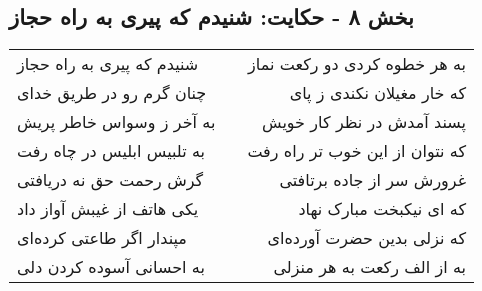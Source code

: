 \begin{center}
\section*{بخش ۸ - حکایت: شنیدم که پیری به راه حجاز}
\label{sec:008}
\begin{longtable}{l p{0.5cm} r}
شنیدم که پیری به راه حجاز
&&
به هر خطوه کردی دو رکعت نماز
\\
چنان گرم رو در طریق خدای
&&
که خار مغیلان نکندی ز پای
\\
به آخر ز وسواس خاطر پریش
&&
پسند آمدش در نظر کار خویش
\\
به تلبیس ابلیس در چاه رفت
&&
که نتوان از این خوب تر راه رفت
\\
گرش رحمت حق نه دریافتی
&&
غرورش سر از جاده برتافتی
\\
یکی هاتف از غیبش آواز داد
&&
که ای نیکبخت مبارک نهاد
\\
مپندار اگر طاعتی کرده‌ای
&&
که نزلی بدین حضرت آورده‌ای
\\
به احسانی آسوده کردن دلی
&&
به از الف رکعت به هر منزلی
\\
\end{longtable}
\end{center}
